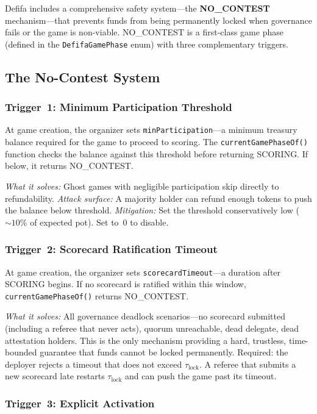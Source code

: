 \documentclass[11pt,a4paper]{article}
\begin{document}
Defifa includes a comprehensive safety system---the \textbf{NO\_CONTEST} mechanism---that prevents funds from being permanently locked when governance fails or the game is non-viable. NO\_CONTEST is a first-class game phase (defined in the \texttt{DefifaGamePhase} enum) with three complementary triggers.

\subsection{The No-Contest System}

\subsubsection{Trigger~1: Minimum Participation Threshold}

At game creation, the organizer sets \texttt{minParticipation}---a minimum treasury balance required for the game to proceed to scoring. The \texttt{currentGamePhaseOf()} function checks the balance against this threshold before returning SCORING. If below, it returns NO\_CONTEST.

\emph{What it solves:} Ghost games with negligible participation skip directly to refundability. \emph{Attack surface:} A majority holder can refund enough tokens to push the balance below threshold. \emph{Mitigation:} Set the threshold conservatively low (${\sim}10\%$ of expected pot). Set to~0 to disable.

\subsubsection{Trigger~2: Scorecard Ratification Timeout}

At game creation, the organizer sets \texttt{scorecardTimeout}---a duration after SCORING begins. If no scorecard is ratified within this window, \texttt{currentGamePhaseOf()} returns NO\_CONTEST.

\emph{What it solves:} All governance deadlock scenarios---no scorecard submitted (including a referee that never acts), quorum unreachable, dead delegate, dead attestation holders. This is the only mechanism providing a hard, trustless, time-bounded guarantee that funds cannot be locked permanently. Required: the deployer rejects a timeout that does not exceed $\tau_{\text{lock}}$. A referee that submits a new scorecard late restarts $\tau_{\text{lock}}$ and can push the game past its timeout.

\subsubsection{Trigger~3: Explicit Activation}
\end{document}
